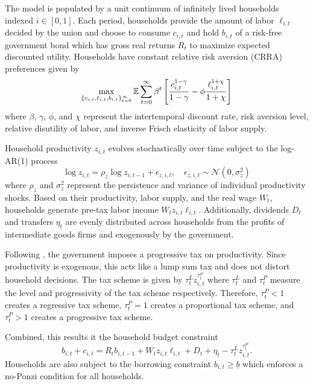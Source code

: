 The model is populated by a unit continuum of infinitely lived households indexed $i \in [0, 1]$. Each period, households provide the amount of labor $\ell_{i, t}$ decided by the union and choose to consume $c_{i, t}$ and hold $b_{i, t}$ of a risk-free government bond which has gross real returns $R_t$ to maximize expected discounted utility. Households have constant relative risk aversion (CRRA) preferences given by 
\begin{equation*}
    \max_{\{c_{i,t}, \ell_{i, t}, b_{i, t}\}_{t=0}^\infty} \mathbb{E} \sum_{t = 0}^\infty \beta^t \left[ \frac{c_{i, t}^{1 - \gamma}}{1 - \gamma} - \phi \frac{\ell_{i, t}^{1 + \chi}}{1 + \chi} \right]
\end{equation*}
where $\beta$, $\gamma$, $\phi$, and $\chi$ represent the intertemporal discount rate, risk aversion level, relative disutility of labor, and inverse Frisch elasticity of labor supply.

Household productivity $z_{i, t}$ evolves stochastically over time subject to the log-AR(1) process
\begin{equation*}
    \log z_{i, t} = \rho_z \log z_{i, t-1} + \epsilon_{z, i, t}, \quad \epsilon_{z, i, t} \sim \mathcal{N} (0, \sigma_z^2) \label{eq:idio_prod}
\end{equation*}
where $\rho_z$ and $\sigma_z^2$ represent the persistence and variance of individual productivity shocks. Based on their productivity, labor supply, and the real wage $W_t$, households generate pre-tax labor income $W_t z_{i, t} \ell_{i, t}$. Additionally, dividends $D_t$ and transfers $\eta_t$ are evenly distributed across households from the profits of intermediate goods firms and exogenously by the government.

Following \textcite{mckay2016power}, the government imposes a progressive tax on productivity. Since productivity is exogenous, this acts like a lump sum tax and does not distort household decisions. The tax scheme is given by $\tau_t^L z_{i, t}^{\tau_t^P}$ where $\tau_t^L$ and $\tau_t^P$ measure the level and progressivity of the tax scheme respectively. Therefore, $\tau_t^P < 1$ creates a regressive tax scheme, $\tau_t^P = 1$ creates a proportional tax scheme, and $\tau_t^P > 1$ creates a progressive tax scheme.

Combined, this results it the household budget constraint
\begin{equation*}
    b_{i, t} + c_{i, t} = R_t b_{i, t-1} + W_t z_{i, t} \ell_{i, t} + D_t + \eta_t - \tau_t^L z_{i, t}^{\tau_t^P}.
\end{equation*}
Households are also subject to the borrowing constraint $b_{i, t} \geq \underline{b}$ which enforces a no-Ponzi condition for all households.

